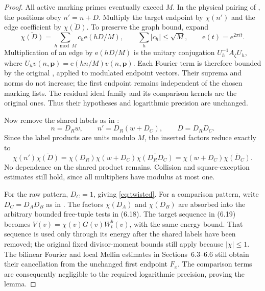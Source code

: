 \documentclass[11pt]{article}
\theoremstyle{remark}
\newcommand{\1}{\mathbf 1}
\newcommand{\e}{\mathrm e}
\begin{document}
\begin{proof}
All active marking primes eventually exceed $M$.  In the
physical pairing of \cite[Section~6.2]{PD}, the positions obey
$n'=n+D$.  Multiply the target endpoint by $\chi(n')$ and
the edge coefficient by $\overline{\chi(D)}$.  To preserve the
graph bound, expand
\[
 \overline{\chi(D)}=\sum_{h\bmod M}c_h\e(hD/M),
 \qquad \sum_h|c_h|\le\sqrt M,
 \qquad \e(t)=e^{2\pi it}.
\]
Multiplication of an edge by $\e(hD/M)$ is the unitary
conjugation $U_h^{-1}A_\zeta U_h$, where
$U_h v(n,\mathbf p)=\e(hn/M)v(n,\mathbf p)$.
Each Fourier term is therefore bounded by the original
\cite[Proposition~6.2]{PD}, applied to modulated endpoint
vectors.  Their suprema and norms do not increase; the first
endpoint remains independent of the chosen marking lists.
The residual ideal family and its comparison kernels are the
original ones.  Thus their hypotheses and logarithmic precision
are unchanged.

Now remove the shared labels as in \cite[(6.14)]{PD}:
\[
 n=D_Rw,\qquad n'=D_R(w+D_C),\qquad D=D_RD_C.
\]
Since the label products are units modulo $M$, the inserted
factors reduce exactly to
\begin{equation}\label{eq:cancellation}
 \chi(n')\overline{\chi(D)}
 =\chi(D_R)\chi(w+D_C)
     \overline{\chi(D_RD_C)}
 =\chi(w+D_C)\overline{\chi(D_C)}.
\end{equation}
No dependence on the shared product remains.  Collision and
square-exception estimates still hold, since all multipliers
have modulus at most one.

For the raw pattern, $D_C=1$, giving \eqref{eq:twisted}.
For a comparison pattern, write $D_C=D_AD_B$ as in
\cite[(6.17)]{PD}.  The factors
$\overline{\chi(D_A)}$ and $\overline{\chi(D_B)}$ are absorbed
into the arbitrary bounded free-tuple tests in (6.18).
The target sequence in (6.19) becomes
$V(v)=\chi(v)G(v)W_t^b(v)$, with the same energy bound.
That sequence is used only through its energy after the shared
labels have been removed; the original fixed divisor-moment
bounds still apply because $|\chi|\le1$.  The bilinear Fourier and local Mellin
estimates in Sections~6.3--6.6 still obtain their cancellation
from the unchanged first endpoint $F_x$.  The comparison terms
are consequently negligible to the required logarithmic
precision, proving the lemma.
\end{proof}
\end{document}
